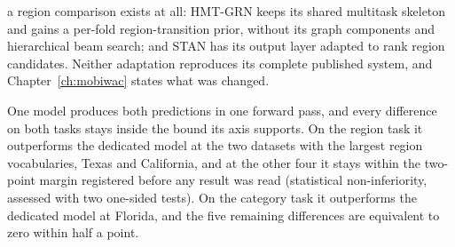 \begin{description}
    a region comparison exists at all: HMT-GRN keeps its shared multitask skeleton
    and gains a per-fold region-transition prior, without its graph components and
    hierarchical beam search; and STAN has its output layer adapted to rank
    region candidates. Neither adaptation reproduces its complete published system, and
    Chapter~\ref{ch:mobiwac} states what was changed.
    \item[Practical.] One model produces both predictions in one forward pass, and every
    difference on both tasks stays inside the bound its axis supports. On the region task it outperforms the dedicated model
    at the two datasets with the largest region vocabularies, Texas and California, and
    at the other four it stays within the two-point margin registered before any result
    was read (statistical non-inferiority, assessed with two one-sided tests). On the
    category task it outperforms the dedicated model at Florida, and the five remaining
    differences are equivalent to zero within half a point.
\end{description}

